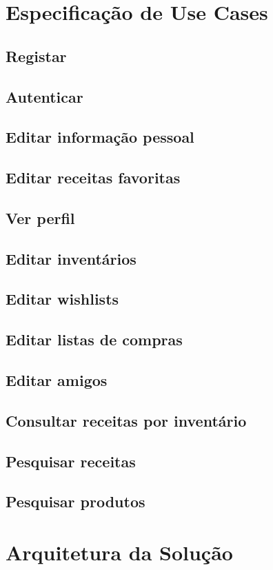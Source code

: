 \documentclass[a4paper]{report}
\begin{document}
\chapter{Especificação de Use Cases}
    \section{Registar}
    \section{Autenticar}
    \section{Editar informação pessoal}
    \section{Editar receitas favoritas}
    \section{Ver perfil}
    \section{Editar inventários}
    \section{Editar wishlists}
    \section{Editar listas de compras}
    \section{Editar amigos}
    \section{Consultar receitas por inventário}
    \section{Pesquisar receitas}
    \section{Pesquisar produtos}

\chapter{Arquitetura da Solução}
\end{document}
